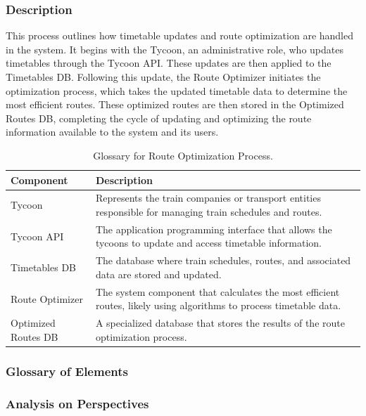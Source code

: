 \subsubsection{Description}
This process outlines how timetable updates and route optimization are handled in the system. It begins with the Tycoon, an administrative role, who updates timetables through the Tycoon API. These updates are then applied to the Timetables DB. Following this update, the Route Optimizer initiates the optimization process, which takes the updated timetable data to determine the most efficient routes. These optimized routes are then stored in the Optimized Routes DB, completing the cycle of updating and optimizing the route information available to the system and its users.

\begin{table}[H]
    \centering
    \caption{Glossary for Route Optimization Process.}
    \label{tab:route_optimization_glossary}
    \begin{tabularx}{\textwidth}{@{}lX@{}} %
    \toprule
    \textbf{Component} & \textbf{Description} \\
    \midrule
    Tycoon & Represents the train companies or transport entities responsible for managing train schedules and routes. \\
    Tycoon API & The application programming interface that allows the tycoons to update and access timetable information. \\
    Timetables DB & The database where train schedules, routes, and associated data are stored and updated. \\
    Route Optimizer & The system component that calculates the most efficient routes, likely using algorithms to process timetable data. \\
    Optimized Routes DB & A specialized database that stores the results of the route optimization process. \\
    \bottomrule
    \end{tabularx}
\end{table}
\subsubsection{Glossary of Elements}

\subsubsection{Analysis on Perspectives}

